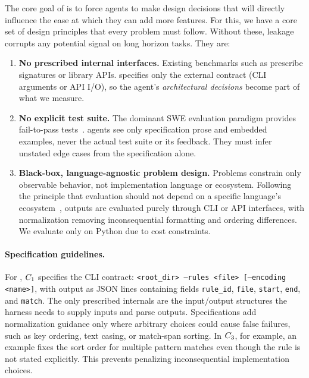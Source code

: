 The core goal of \scb{} is to force agents to make design decisions that will directly influence the ease at which they can add more features. For this, we have a core set of design principles that every problem must follow. Without these, leakage corrupts any potential signal on long horizon tasks. They are:

\begin{enumerate}[leftmargin=*]
    \item \textbf{No prescribed internal interfaces.} Existing benchmarks such as \citep{humaneval, mbpp, bigcodebench,evocodebench, repobench} prescribe signatures or library APIs. \scb{} specifies only the external contract (CLI arguments or API I/O), so the agent's \emph{architectural decisions} become part of what we measure.
    \item \textbf{No explicit test suite.} The dominant SWE evaluation paradigm provides fail-to-pass tests~\citep{swe-bench, swe-bench-plus, multi-swe-bench, rust-swe-bench, swe-rebench-v2, omnicode, longcli-bench, recode-h}. \scb{} agents see only specification prose and embedded examples, never the actual test suite or its feedback. They must infer unstated edge cases from the specification alone.
    \item \textbf{Black-box, language-agnostic problem design.} Problems constrain only observable behavior, not implementation language or ecosystem. Following the principle that evaluation should not depend on a specific language's ecosystem~\citep{babelcode, ide-bench, fea-bench}, outputs are evaluated purely through CLI or API interfaces, with normalization removing inconsequential formatting and ordering differences. We evaluate only on Python due to cost constraints.
\end{enumerate}

\paragraph{Specification guidelines.} For \codesearch{}, $C_{1}$ specifies the CLI contract: \texttt{<root\_dir> --rules <file> [--encoding <name>]}, with output as JSON lines containing fields \texttt{rule\_id}, \texttt{file}, \texttt{start}, \texttt{end}, and \texttt{match}. The only prescribed internals are the input/output structures the harness needs to supply inputs and parse outputs. Specifications add normalization guidance only where arbitrary choices could cause false failures, such as key ordering, text casing, or match-span sorting. In $C_{3}$, for example, an example fixes the sort order for multiple pattern matches even though the rule is not stated explicitly. This prevents penalizing inconsequential implementation choices.

